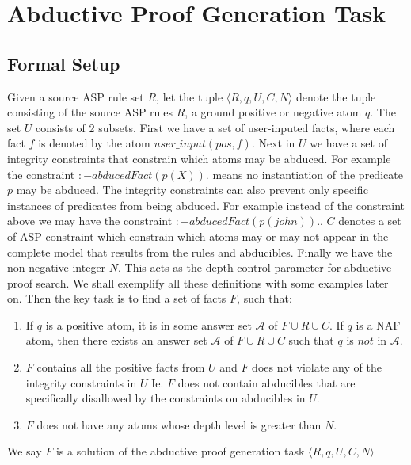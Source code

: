 \section{Abductive Proof Generation Task}\label{sec:abductive_proof}

\subsection{Formal Setup}\label{formalsetup}
Given a source ASP rule set $R$, let the tuple $\langle R,q,U,C,N \rangle$ denote the tuple consisting of the source ASP rules $R$, a ground positive or negative atom $q$. The set $U$ consists of 2 subsets. First we have a set of user-inputed facts, where each fact $f$ is denoted by the atom $user\_input(pos,f)$. Next in $U$ we have a set of integrity constraints that constrain which atoms may be abduced. For example the constraint $:-abducedFact(p(X)).$ means no instantiation of the predicate $p$ may be abduced. The integrity constraints can also prevent only specific instances of predicates from being abduced. For example instead of the constraint above we may have the constraint $:-abducedFact(p(john)).$.  $C$ denotes a set of ASP constraint which constrain which atoms may or may not appear in the complete model that results from the rules and abducibles. Finally we have the non-negative integer $N$. This acts as the depth control parameter for abductive proof search. We shall exemplify all these definitions with some examples later on. Then the key task is to find a set of facts $F$, such that:

\begin{enumerate}
    \item If $q$ is a positive atom, it is in some answer set $\mathcal{A}$ of $F\cup R\cup C$. If $q$ is a NAF atom, then there exists an answer set $\mathcal{A}$ of $F\cup R\cup C$ such that $q$ is $not$ in $\mathcal{A}$.
    \item $F$ contains all the positive facts from $U$ and $F$ does not violate any of the integrity constraints in $U$ Ie. $F$ does not contain abducibles that are specifically disallowed by the constraints on abducibles in $U$.
    \item $F$ does not have any atoms whose depth level is greater than $N$.
\end{enumerate}
We say $F$ is a solution of the abductive proof generation task $\langle R,q,U,C,N \rangle$

